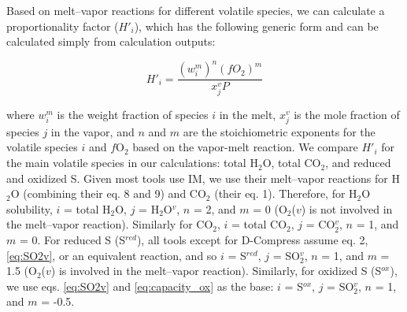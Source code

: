 \documentclass[draft, english]{volcanica-template}
\begin{document}
Based on melt–vapor reactions for different volatile species, we can calculate a proportionality factor ($H'_{i}$), which has the following generic form and can be calculated simply from calculation outputs:

\begin{equation}
    H'_{i} = \frac{\left( w^m_{i} \right)^n\left( fO_2 \right)^m}{x^v_{j}P}
    \label{eq:propfac}
\end{equation}

\noindent where $w^m_{i}$ is the weight fraction of species $i$ in the melt, ${x^v_{j}}$ is the mole fraction of species $j$ in the vapor, and $n$ and $m$ are the stoichiometric exponents for the volatile species $i$ and $f$O$_2$ based on the vapor-melt reaction. We compare $H'_{i}$ for the main volatile species in our calculations: total H$_2$O, total CO$_2$, and reduced and oxidized S. Given most tools use IM, we use their melt–vapor reactions for H$_2$O (combining their eq. 8 and 9) and CO$_2$ (their eq. 1). Therefore, for H$_2$O solubility, $i$ = total H$_2$O, $j$ = H$_2$O$^{v}$, $n$ = 2, and $m$ = 0 (O$_2$($v$) is not involved in the melt–vapor reaction). Similarly for CO$_2$, $i$ = total CO$_2$, $j$ = CO$_2^{v}$, $n$ = 1, and $m$ = 0. For reduced S (S$^{red}$), all tools except for D-Compress assume eq. 2, \ref{eq:SO2v}, or an equivalent reaction, and so $i$ = S$^{red}$, $j$ = SO$_2^{v}$, $n$ = 1, and $m$ = 1.5 (O$_2$($v$) is involved in the melt–vapor reaction). Similarly, for oxidized S (S$^{ox}$), we use eqs. \ref{eq:SO2v} and \ref{eq:capacity_ox} as the base: $i$ = S$^{ox}$, $j$ = SO$_2^{v}$, $n$ = 1, and $m$ = -0.5. 
\end{document}
